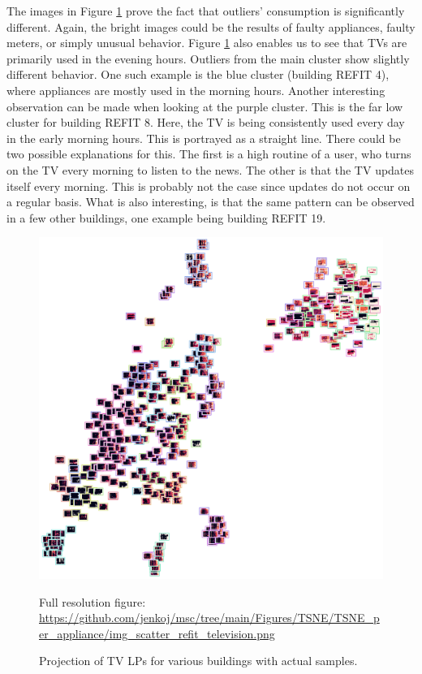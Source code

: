 The images in Figure \ref{fig:tsne_pa_img_scatter_all_tv} prove the fact that outliers' consumption is significantly different. 
Again, the bright images could be the results of faulty appliances, faulty meters, or simply unusual behavior. 
Figure \ref{fig:tsne_pa_img_scatter_all_tv} also enables us to see that TVs are primarily used in the evening hours. 
Outliers from the main cluster show slightly different behavior. 
One such example is the blue cluster (building REFIT 4), where appliances are mostly used in the morning hours. 
Another interesting observation can be made when looking at the purple cluster. 
This is the far low cluster for building REFIT 8. Here, the TV is being consistently used every day in the early morning hours. 
This is portrayed as a straight line. There could be two possible explanations for this. 
The first is a high routine of a user, who turns on the TV every morning to listen to the news. 
The other is that the TV updates itself every morning. 
This is probably not the case since updates do not occur on a regular basis. 
What is also interesting, is that the same pattern can be observed in a few other buildings, one example being building REFIT 19.

\begin{figure}[H]
	\centering
	\caption{Projection of TV LPs for various buildings with actual samples.}
	\includegraphics[width=.9\textwidth]{Figures/TSNE/TSNE_per_appliance/img_scatter_refit_television.png}
	\label{fig:tsne_pa_img_scatter_all_tv}
	\par
	\par\footnotesize{Full resolution figure: \url{https://github.com/jenkoj/msc/tree/main/Figures/TSNE/TSNE_per_appliance/img_scatter_refit_television.png}}
\end{figure}

